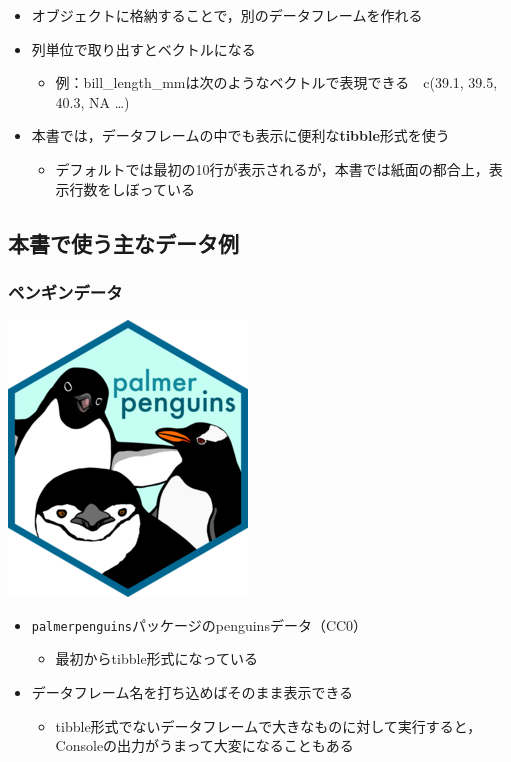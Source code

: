 \documentclass[
  xelatex,ja=standard, b5paper]{bxjsbook}
\providecommand{\tightlist}{%
  \setlength{\itemsep}{0pt}\setlength{\parskip}{0pt}}
\begin{document}
\begin{itemize}
\tightlist
\item
  オブジェクトに格納することで，別のデータフレームを作れる
\item
  列単位で取り出すとベクトルになる

  \begin{itemize}
  \tightlist
  \item
    例：bill\_length\_mmは次のようなベクトルで表現できる　c(39.1, 39.5, 40.3, NA \ldots)
  \end{itemize}
\item
  本書では，データフレームの中でも表示に便利な\textbf{tibble}形式を使う

  \begin{itemize}
  \tightlist
  \item
    デフォルトでは最初の10行が表示されるが，本書では紙面の都合上，表示行数をしぼっている
  \end{itemize}
\end{itemize}

\hypertarget{p-df-main}{%
\subsection{本書で使う主なデータ例}\label{p-df-main}}

\hypertarget{p-df-main-p}{%
\subsubsection{ペンギンデータ}\label{p-df-main-p}}

\includegraphics{images/penguins_logo.png}

\begin{itemize}
\tightlist
\item
  \texttt{palmerpenguins}パッケージのpenguinsデータ（CC0）

  \begin{itemize}
  \tightlist
  \item
    最初からtibble形式になっている
  \end{itemize}
\item
  データフレーム名を打ち込めばそのまま表示できる

  \begin{itemize}
  \tightlist
  \item
    tibble形式でないデータフレームで大きなものに対して実行すると，Consoleの出力がうまって大変になることもある
  \end{itemize}
\end{itemize}
\end{document}
